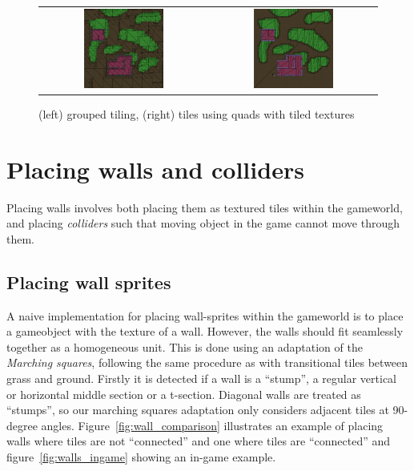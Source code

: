 \begin{figure}[H]
    \centering
    \begin{tabular}{cc}
        \includegraphics[width=0.5\textwidth]{figures/generating_levels/grouped-tile.png}
        &
        \includegraphics[width=0.5\textwidth]{figures/generating_levels/quad-tile.png}
    \end{tabular}
    \caption{(left) grouped tiling, (right) tiles using quads with tiled
    textures}\label{fig:quad_tiling_comparison}
\end{figure}

\section{Placing walls and colliders}
Placing walls involves both placing them as textured tiles within the gameworld, and placing \textit{colliders} such that moving object in the game cannot move through them.

\subsection{Placing wall sprites}
A naive implementation for placing wall-sprites within the gameworld is to place a gameobject with the texture of a wall.
However, the walls should fit seamlessly together as a homogeneous unit.
This is done using an adaptation of the \textit{Marching squares}, following the same procedure as with transitional tiles between grass and ground.
Firstly it is detected if a wall is a ``stump'', a regular vertical or horizontal middle section or a t-section. 
Diagonal walls are treated as ``stumps'', so our marching squares adaptation only considers adjacent tiles at 90-degree angles.
Figure~\ref{fig:wall_comparison} illustrates an example of placing walls where tiles are not ``connected'' and one where tiles are ``connected'' and figure~\ref{fig:walls_ingame} showing an in-game example.

